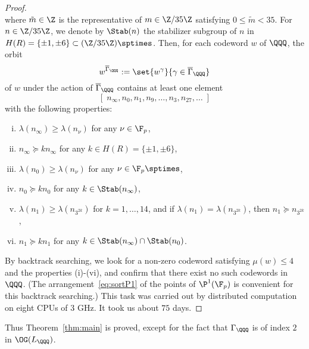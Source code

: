 \documentclass{amsart}
\begin{document}
\begin{proof}
$$$$
where $\tilde{m}\in \Z$ is the representative  of $m\in \Z/35\Z$ satisfying $0\le \tilde{m}<35$.
For $n\in \Z/35\Z$,
we denote by  $\Stab(n)$ the stabilizer subgroup of $n$ in $H(R)=\{\pm 1, \pm 6\}\subset (\Z/35\Z)\sptimes$.
Then, for each codeword $w$ of $\QQQ$,
the orbit 
$$
w^{\overline{\Gamma}_{\QQQ}}:=\set{w^\gamma}{\gamma\in \overline{\Gamma}_{\QQQ}}
$$
of $w$ under the action of  $\overline{\Gamma}_{\QQQ}$
contains at least one element 
$$
[\;n_{\infty}, n_{0}, n_{1}, n_{9}, \dots, n_{3}, n_{27}, \dots\;]
$$
with the following properties:
%
\begin{enumerate}[(i)]
\item $\lambda(n_{\infty})\ge \lambda(n_{\nu})$ for any $\nu\in \F_p$, 
\item $n_{\infty}\succeq k n_{\infty} $ for any $k\in H(R)=\{\pm 1, \pm 6\}$,
\item $\lambda(n_{0})\ge \lambda(n_{\nu})$ for any $\nu\in \F_p\sptimes$, 
\item $n_{0}\succeq k n_{0}$ for any $k\in \Stab(n_{\infty})$,
\item $\lambda(n_{1})\ge \lambda(n_{3^{2k}})$ for $k=1, \dots, 14$, 
and if  $\lambda(n_{1})= \lambda(n_{3^{2k}})$, then $n_{1} \succeq n_{3^{2k}}$, 
\item $n_{1}\succeq   k n_{1}$ for any $k\in \Stab(n_{\infty})\cap \Stab (n_0)$.
\end{enumerate}
%
By backtrack searching, 
we look for a non-zero codeword satisfying $\mu(w)\le 4$ and the properties (i)-(vi),
and confirm that there exist no such codewords in $\QQQ$.
(The arrangement~\eqref{eq:sortP1} of the points of $\P^1(\F_p)$  is convenient  for this backtrack searching.)
This task was carried out 
by distributed computation on eight CPUs of $3$ GHz.
It took us about $75$ days.
\end{proof}
%
Thus Theorem~\ref{thm:main} is proved,
except for the fact that $\Gamma_{\QQQ}$ is of index $2$ in $\OG(L_{\QQQ})$.  
%
\end{document}
